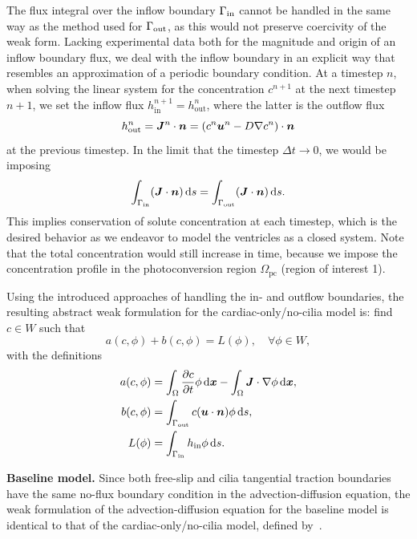 \documentclass{WileyMSP-template}
\begin{document}
The flux integral over the inflow boundary $\Gamma_{\mathrm{in}}$ cannot be handled
in the same way as the method used for $\Gamma_{\mathrm{out}}$, as this would not preserve
coercivity of the weak form. Lacking experimental data both for the magnitude and
origin of an inflow boundary flux, we deal with the inflow boundary in an explicit
way that resembles an approximation of a periodic boundary condition. At a timestep $n$,
when solving the linear system for the concentration $c^{n+1}$ at the next timestep $n+1$,
we set the inflow flux $h_{\mathrm{in}}^{n+1} = h_{\mathrm{out}}^{n}$, where the
latter is the outflow flux
\begin{equation*}
    h_{\mathrm{out}}^{n} = \bm{J}^n\cdot\bm{n} = (c^n\bm{u}^n - D\nabla c^n)\cdot\bm{n}
\end{equation*}
at the previous timestep. In the limit that the timestep $\Delta t\to 0$, we would be imposing
\begin{equation*}
    \int_{\Gamma_{\mathrm{in}}}(\bm{J}\cdot\bm{n}) \, \mathrm ds = \int_{\Gamma_{\mathrm{out}}}(\bm{J}\cdot\bm{n}) \, \mathrm ds.
\end{equation*}
This implies conservation of solute concentration at each timestep,
which is the desired behavior
as we endeavor to model the ventricles as a closed system.
Note that the total concentration would still increase in time,
because we impose the concentration profile in the photoconversion
region $\Omega_{\mathrm{pc}}$ (region of interest 1).

Using the introduced approaches of handling the in- and outflow boundaries,
the resulting abstract weak formulation for the cardiac-only/no-cilia model is:
find $c\in W$ such that
\begin{equation}
    a(c, \phi) + b(c, \phi) = L(\phi), \quad\forall\phi\in W, \label{eq:adv_diff_weak_formB}
\end{equation}
with the definitions
\begin{align}
    a(c, \phi) &= \int_{\Omega}\frac{\partial c}{\partial t}\phi \, \mathrm d\bm{x} - \int_{\Omega}\bm{J}\cdot\nabla\phi \, \mathrm d\bm{x},
    \label{eq:adv_diff_bilinear_form}\\
    b(c, \phi) &= \int_{\Gamma_{\mathrm{out}}}c(\bm{u}\cdot\bm{n})\phi \, \mathrm ds, \label{eq:adv_diff_skew_form} \\
    L(\phi) &= \int_{\Gamma_{\mathrm{in}}}h_{\mathrm{in}}\phi \, \mathrm ds.\label{eq:adv_diff_linear_form}
\end{align}

\textbf{Baseline model.} Since both free-slip and cilia tangential
traction boundaries have the same no-flux boundary condition
in the advection-diffusion equation, the weak formulation of
the advection-diffusion equation for the baseline model is
identical to that of the cardiac-only/no-cilia model,
defined by~.
\end{document}
